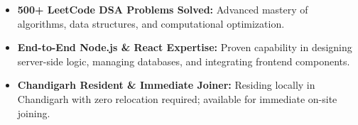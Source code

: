 \documentclass[a4paper,10pt]{article}
\begin{document}
\begin{itemize}

    \item \textbf{500+ LeetCode DSA Problems Solved:} Advanced mastery of algorithms, data structures, and computational optimization.

    \item \textbf{End-to-End Node.js \& React Expertise:} Proven capability in designing server-side logic, managing databases, and integrating frontend components.

    \item \textbf{Chandigarh Resident \& Immediate Joiner:} Residing locally in Chandigarh with zero relocation required; available for immediate on-site joining.

\end{itemize}

\end{document}
